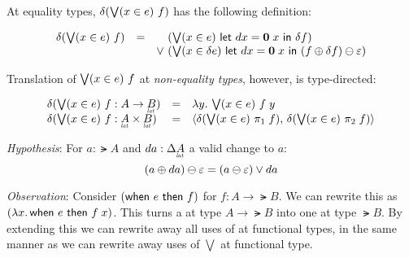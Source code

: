 \documentclass{article}
\begin{document}
At equality types, $\delta(\textstyle\bigvee({x \in e})\  f)$ has the following definition:

\[\begin{array}{rcl}
  \delta(\textstyle\bigvee({x \in e})\  f)
  &=& \phantom{\vee~} (\textstyle\bigvee({x \in e})\  \mathsf{let}~dx = \mathbf{0}\; x ~\mathsf{in}~ \delta f)
  \\ && \vee~ (\textstyle\bigvee({x \in \delta e})\  \mathsf{let}~dx = \mathbf{0}\; x ~\mathsf{in}~
    (f \oplus \delta f) \ominus \varepsilon)
\end{array}\]



Translation of $\textstyle\bigvee({x \in e})\  f$ at \emph{non-equality types}, however, is
type-directed:

\[\begin{array}{lcll}
  \delta(\downelim{x}{e}{f} : A \to \lat{B})
  &=& \fn\bind{y} \downelim{x}{e}{f\; y}\\
  \delta(\downelim{x}{e}{f} : \lat{A} \x \lat{B})
  &=& \pair{\delta(\downelim{x}{e}{\pi_1\; f})}
  {\delta(\downelim{x}{e}{\pi_2\; f})}
\end{array}\]

\emph{Hypothesis}: For $a : \lat{A}$ and $da : \GD\lat{A}$ a valid change to
$a$:
\begin{equation*}
  (a \oplus da) \ominus \varepsilon = (a \ominus \varepsilon)
  \vee da
\end{equation*}

\emph{Observation}: Consider $(\mathsf{when}~{e}~\mathsf{then}~{f})$ for $f : A \to \lat{B}$. We can
rewrite this as $(\lambda{x}.\, \mathsf{when}~{e}~\mathsf{then}~{f\; x})$. This turns a  at type
$A \to \lat{B}$ into one at type $\lat{B}$. By extending this we can rewrite
away all uses of  at functional types, in the same manner as we can
rewrite away uses of $\bigvee$ at functional type.

\end{document}
